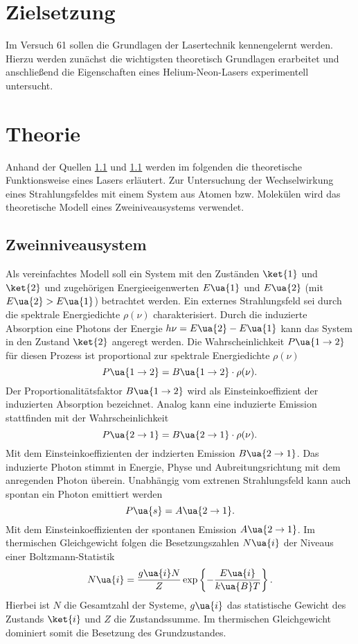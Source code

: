 \setcounter{page}{1}
\section*{Zielsetzung}
Im Versuch 61 sollen die Grundlagen der Lasertechnik kennengelernt werden. Hierzu werden zunächst die
wichtigsten theoretisch Grundlagen erarbeitet und anschließend die Eigenschaften eines Helium-Neon-Lasers
experimentell untersucht.
\section{Theorie}
Anhand der Quellen \ref{} und \ref{} werden im folgenden die theoretische Funktionsweise eines Lasers
erläutert. Zur Untersuchung der Wechselwirkung eines Strahlungsfeldes mit einem System aus Atomen bzw. Molekülen
wird das theoretische Modell eines Zweiniveausystems verwendet.
\subsection{Zweinniveausystem}
Als vereinfachtes Modell soll ein System mit den Zuständen $\ket{1}$ und $\ket{2}$ und zugehörigen Energieeigenwerten
$E\ua{1}$ und $E\ua{2}$ (mit $E\ua{2}> E\ua{1}$) betrachtet werden. Ein externes Strahlungsfeld sei durch die spektrale Energiedichte $\rho(\nu)$
charakterisiert. Durch die induzierte Absorption eine Photons der Energie $h \nu = E\ua{2} - E\ua{1}$ kann das
System in den Zustand $\ket{2}$ angeregt werden. Die Wahrscheinlichkeit $P\ua{1\rightarrow 2}$ für diesen Prozess ist proportional
zur spektrale Energiedichte $\rho(\nu)$
\begin{equation}
  P\ua{1\rightarrow 2} = B\ua{1\rightarrow 2}\cdot\rho(\nu).
\end{equation}
Der Proportionalitätsfaktor $B\ua{1\rightarrow 2}$ wird als Einsteinkoeffizient der induzierten Absorption bezeichnet. Analog kann
eine induzierte Emission stattfinden mit der Wahrscheinlichkeit
\begin{equation}
  P\ua{2\rightarrow 1} = B\ua{2\rightarrow 1}\cdot\rho(\nu).
\end{equation}
Mit dem Einsteinkoeffizienten der indzierten Emission $B\ua{2\rightarrow1}$.
Das induzierte Photon stimmt in Energie, Physe und Aubreitungsrichtung mit dem anregenden Photon überein.
Unabhängig vom extrenen Strahlungsfeld
kann auch spontan ein Photon emittiert werden
\begin{equation}
  P\ua{s} = A\ua{2 \rightarrow 1}.
\end{equation}
Mit dem Einsteinkoeffizienten der spontanen Emission $A\ua{2 \rightarrow 1}$. Im thermischen Gleichgewicht folgen die Besetzungszahlen
$N\ua{i}$ der Niveaus einer Boltzmann-Statistik
\begin{equation}
  N\ua{i} = \frac{g\ua{i}N}{Z}\exp\left\{-\frac{E\ua{i}}{k\ua{B}T}\right\}.
\end{equation}
Hierbei ist $N$ die Gesamtzahl der Systeme, $g\ua{i}$ das statistische Gewicht des Zustands $\ket{i}$ und $Z$ die Zustandssumme. Im thermischen
Gleichgewicht dominiert somit die Besetzung des Grundzustandes.

